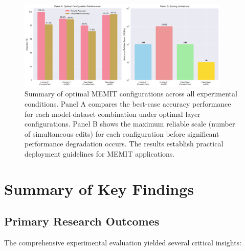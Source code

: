 \begin{figure}[H]
\centering
\includegraphics[width=0.9\textwidth]{figures/optimal_configurations.png}
\caption[Optimal MEMIT Configuration Summary]{Summary of optimal MEMIT configurations across all experimental conditions. Panel A compares the best-case accuracy performance for each model-dataset combination under optimal layer configurations. Panel B shows the maximum reliable scale (number of simultaneous edits) for each configuration before significant performance degradation occurs. The results establish practical deployment guidelines for MEMIT applications.}
\label{fig:optimal_configurations}
\end{figure}

\section{Summary of Key Findings}
\label{sec:key_findings}

\subsection{Primary Research Outcomes}
\label{subsec:primary_outcomes}

The comprehensive experimental evaluation yielded several critical insights:

